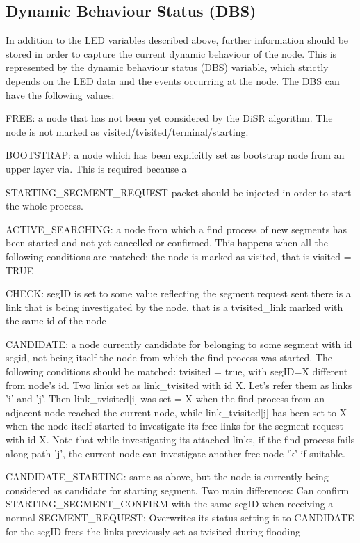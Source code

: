 \documentclass[conference]{IEEEtran}
\begin{document}
\subsection{Dynamic Behaviour Status (DBS)}
In addition to the LED variables
described above, further information should be stored in order to
capture the current dynamic behaviour of the node. This is represented
by the dynamic behaviour status (DBS) variable, which strictly depends
on the LED data and the events occurring at the node. The DBS can have
the following values:

FREE: a node that has  not been yet considered  by the DiSR algorithm.
The node is not marked as visited/tvisited/terminal/starting.

BOOTSTRAP: a node which has been explicitly set as bootstrap node from
an upper layer via. This is required because a

STARTING\_SEGMENT\_REQUEST packet should be injected in order to start
the whole process.

ACTIVE\_SEARCHING: a node from which a find process of new segments has
been started and not yet cancelled or confirmed. This happens when all
the following conditions are matched: the node is marked as visited,
that is visited = TRUE 

CHECK: segID is set to some value reflecting
the segment request sent there is a link that is being investigated by
the node, that is a tvisited\_link marked with the same id of the node 

CANDIDATE: a node currently candidate for belonging to some segment
with id segid, not being itself the node from which the find process
was started. The following conditions should be matched: tvisited =
true, with segID=X different from node's id.  Two links set as
link\_tvisited with id X. Let’s refer them as  links 'i' and 'j'. Then
link\_tvisited[i] was set = X when the find process from an adjacent
node reached the current node, while link\_tvisited[j] has been set to
X when the node itself started to investigate its free links for the
segment request with id X. Note that while investigating its attached
links, if the find process fails along path 'j', the current node can
investigate another free node 'k' if suitable.  

CANDIDATE\_STARTING:
same as above, but the node is currently being considered as candidate
for starting segment. Two main differences: Can confirm
STARTING\_SEGMENT\_CONFIRM with the same segID when receiving a normal
SEGMENT\_REQUEST: Overwrites its status setting it to CANDIDATE for the
segID frees the links previously set as tvisited during flooding
\end{document}
